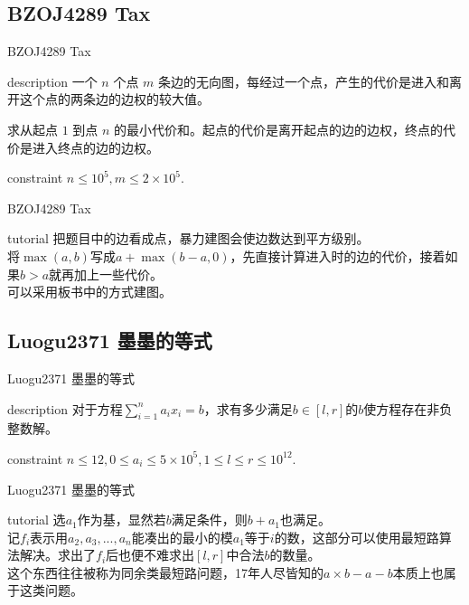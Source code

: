 \documentclass{beamer}
\begin{document}
\subsection{BZOJ4289 Tax}
\begin{frame}{BZOJ4289 Tax}
	\begin{block}{description}
		一个 $n$ 个点 $m$ 条边的无向图，每经过一个点，产生的代价是进入和离开这个点的两条边的边权的较大值。
		
		求从起点 $1$ 到点 $n$ 的最小代价和。起点的代价是离开起点的边的边权，终点的代价是进入终点的边的边权。
	\end{block}
	\begin{block}{constraint}
		$n \le 10^5, m \le 2 \times 10^5.$
	\end{block}
\end{frame}
\begin{frame}{BZOJ4289 Tax}
	\begin{block}{tutorial}
		把题目中的边看成点，暴力建图会使边数达到平方级别。\\
		
		将$\max(a,b)$写成$a+\max(b-a,0)$，先直接计算进入时的边的代价，接着如果$b>a$就再加上一些代价。\\
		
		可以采用板书中的方式建图。
	\end{block}
\end{frame}


\subsection{Luogu2371 墨墨的等式}
\begin{frame}{Luogu2371 墨墨的等式}
	\begin{block}{description}
		对于方程$\sum_{i=1}^na_ix_i = b$，求有多少满足$b \in [l,r]$的$b$使方程存在非负整数解。
	\end{block}
	\begin{block}{constraint}
		$n \le 12, 0 \le a_i \le 5 \times 10^5, 1 \le l \le r \le 10^{12}.$
	\end{block}
\end{frame}
\begin{frame}{Luogu2371 墨墨的等式}
	\begin{block}{tutorial}
		选$a_1$作为基，显然若$b$满足条件，则$b+a_1$也满足。\\
		
		记$f_i$表示用$a_2,a_3,...,a_n$能凑出的最小的模$a_1$等于$i$的数，这部分可以使用最短路算法解决。求出了$f_i$后也便不难求出$[l,r]$中合法$b$的数量。\\
		
		这个东西往往被称为同余类最短路问题，17年人尽皆知的$a\times b - a - b$本质上也属于这类问题。
	\end{block}
\end{frame}
\end{document}
